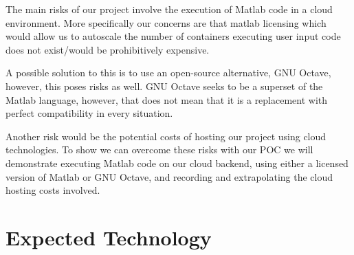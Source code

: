 \documentclass{article}
\begin{document}
The main risks of our project involve the execution of Matlab code in a cloud environment. More specifically our concerns are that matlab licensing which would allow us to autoscale the number of containers executing user input code does not exist/would be prohibitively expensive. 

A possible solution to this is to use an open-source alternative, GNU Octave, however, this poses risks as well. GNU Octave seeks to be a superset of the Matlab language, however, that does not mean that it is a replacement with perfect compatibility in every situation. 

Another risk would be the potential costs of hosting our project using cloud technologies. To show we can overcome these risks with our POC we will demonstrate executing Matlab code on our cloud backend, using either a licensed version of Matlab or GNU Octave, and recording and extrapolating the cloud hosting costs involved.

\section{Expected Technology}
\end{document}
